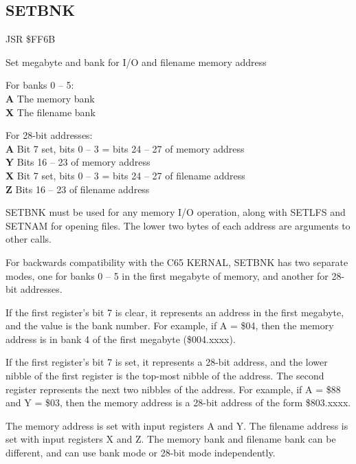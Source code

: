 \subsection{SETBNK}
\label{KERNAL Jump Table!SETBNK}
\begin{description}[leftmargin=2cm,style=nextline]
    \item [Address:] JSR \$FF6B
    \item [Description:] Set megabyte and bank for I/O and filename memory address
    \item [Inputs:]
        For banks 0 -- 5: \\
        \textbf{A} The memory bank \\
        \textbf{X} The filename bank

        For 28-bit addresses: \\
        \textbf{A} Bit 7 set, bits 0 -- 3 = bits 24 -- 27 of memory address \\
        \textbf{Y} Bits 16 -- 23 of memory address \\
        \textbf{X} Bit 7 set, bits 0 -- 3 = bits 24 -- 27 of filename address \\
        \textbf{Z} Bits 16 -- 23 of filename address
    \item [Remarks:]
        SETBNK must be used for any memory I/O operation, along with SETLFS and SETNAM for opening files. The lower two bytes of each address are arguments to other calls.

        For backwards compatibility with the C65 KERNAL, SETBNK has two separate modes, one for banks 0 -- 5 in the first megabyte of memory, and another for 28-bit addresses.

        If the first register's bit 7 is clear, it represents an address in the first megabyte, and the value is the bank number. For example, if A = \$04, then the memory address is in bank 4 of the first megabyte (\$004.xxxx).

        If the first register's bit 7 is set, it represents a 28-bit address, and the lower nibble of the first register is the top-most nibble of the address. The second register represents the next two nibbles of the address. For example, if A = \$88 and Y = \$03, then the memory address is a 28-bit address of the form \$803.xxxx.

        The memory address is set with input registers A and Y. The filename address is set with input registers X and Z. The memory bank and filename bank can be different, and can use bank mode or 28-bit mode independently.


\end{description}
